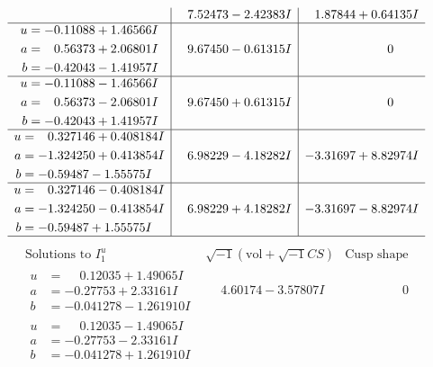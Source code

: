 \documentclass[1p]{elsarticle_modified}
\theoremstyle{definition}
\newcommand{\I}{\sqrt{-1}}
\begin{document}
$$\begin{array}{c|c|c}
 & \phantom{-}7.52473 - 2.42383 I & \phantom{-}1.87844 + 0.64135 I \\ \hline\begin{aligned}
u &= -0.11088 + 1.46566 I \\
a &= \phantom{-}0.56373 + 2.06801 I \\
b &= -0.42043 - 1.41957 I\end{aligned}
 & \phantom{-}9.67450 - 0.61315 I & \phantom{-0.000000 } 0 \\ \hline\begin{aligned}
u &= -0.11088 - 1.46566 I \\
a &= \phantom{-}0.56373 - 2.06801 I \\
b &= -0.42043 + 1.41957 I\end{aligned}
 & \phantom{-}9.67450 + 0.61315 I & \phantom{-0.000000 } 0 \\ \hline\begin{aligned}
u &= \phantom{-}0.327146 + 0.408184 I \\
a &= -1.324250 + 0.413854 I \\
b &= -0.59487 - 1.55575 I\end{aligned}
 & \phantom{-}6.98229 - 4.18282 I & -3.31697 + 8.82974 I \\ \hline\begin{aligned}
u &= \phantom{-}0.327146 - 0.408184 I \\
a &= -1.324250 - 0.413854 I \\
b &= -0.59487 + 1.55575 I\end{aligned}
 & \phantom{-}6.98229 + 4.18282 I & -3.31697 - 8.82974 I\\
 \hline 
 \end{array}$$\newpage$$\begin{array}{c|c|c}  
\text{Solutions to }I^u_{1}& \I (\text{vol} + \sqrt{-1}CS) & \text{Cusp shape}\\
 \hline 
\begin{aligned}
u &= \phantom{-}0.12035 + 1.49065 I \\
a &= -0.27753 + 2.33161 I \\
b &= -0.041278 - 1.261910 I\end{aligned}
 & \phantom{-}4.60174 - 3.57807 I & \phantom{-0.000000 } 0 \\ \hline\begin{aligned}
u &= \phantom{-}0.12035 - 1.49065 I \\
a &= -0.27753 - 2.33161 I \\
b &= -0.041278 + 1.261910 I\end{aligned}

\end{array}$$
\end{document}
